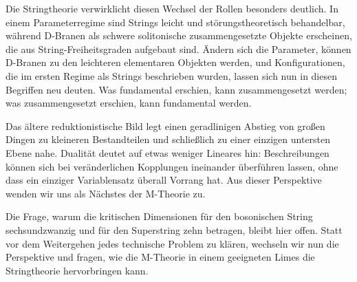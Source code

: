 Die Stringtheorie verwirklicht diesen Wechsel der Rollen besonders deutlich. In einem Parameterregime sind Strings leicht und störungstheoretisch behandelbar, während D-Branen als schwere solitonische zusammengesetzte Objekte erscheinen, die aus String-Freiheitsgraden aufgebaut sind. Ändern sich die Parameter, können D-Branen zu den leichteren elementaren Objekten werden, und Konfigurationen, die im ersten Regime als Strings beschrieben wurden, lassen sich nun in diesen Begriffen neu deuten. Was fundamental erschien, kann zusammengesetzt werden; was zusammengesetzt erschien, kann fundamental werden.

Das ältere reduktionistische Bild legt einen geradlinigen Abstieg von großen Dingen zu kleineren Bestandteilen und schließlich zu einer einzigen untersten Ebene nahe. Dualität deutet auf etwas weniger Lineares hin: Beschreibungen können sich bei veränderlichen Kopplungen ineinander überführen lassen, ohne dass ein einziger Variablensatz überall Vorrang hat. Aus dieser Perspektive wenden wir uns als Nächstes der M-Theorie zu.

Die Frage, warum die kritischen Dimensionen für den bosonischen String sechsundzwanzig und für den Superstring zehn betragen, bleibt hier offen. Statt vor dem Weitergehen jedes technische Problem zu klären, wechseln wir nun die Perspektive und fragen, wie die M-Theorie in einem geeigneten Limes die Stringtheorie hervorbringen kann.